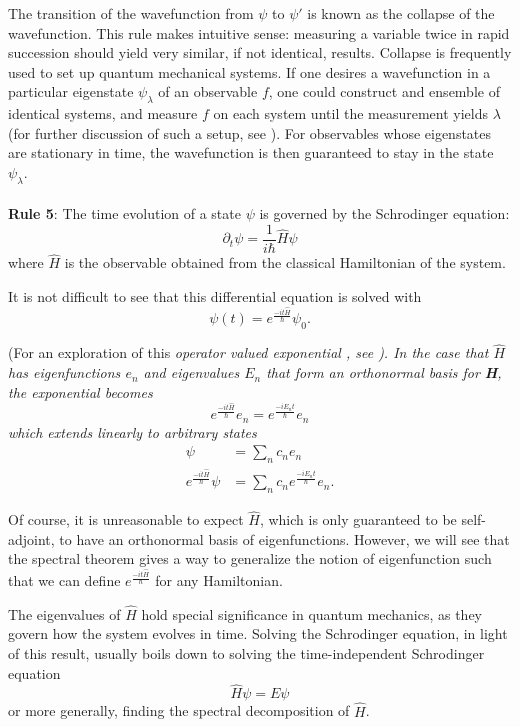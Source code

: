 The transition of the wavefunction from $\psi$ to $\psi '$ is known as the
collapse of the wavefunction. This rule makes intuitive sense: measuring a
variable twice in rapid succession should yield very similar, if not identical,
results. Collapse is frequently used to set up quantum mechanical systems. If
one desires a wavefunction in a particular eigenstate $\psi_{\lambda}$ of an
observable $f$, one could construct and ensemble of identical systems, and
measure $f$ on each system until the measurement yields $\lambda$ (for further
discussion of such a setup, see \cite{griffiths2005}). For observables
whose eigenstates are stationary in time, the wavefunction is then guaranteed to
stay in the state
$\psi_{\lambda}$.
\\
\\
\textbf{Rule 5}: The time evolution of a state $\psi$ is governed by the
Schrodinger equation:
\[
    \partial_t \psi = \frac{1}{i\hbar}\hat{H}\psi
\]
where $\hat{H}$ is the observable obtained from the classical Hamiltonian of the
system.

It is not difficult to see that this differential equation is solved with
\[
    \psi(t) = e^{\frac{-it\hat{H}}{\hbar}}\psi_0.
\]

(For an exploration of this \em operator valued exponential \em, see \cite[p.
74,208]{Hall2013}).
In the case that $\hat{H}$ has eigenfunctions
${e_n}$ and eigenvalues ${E_n}$ that form an orthonormal basis for \textbf{H},
the exponential becomes
\[
    e^{\frac{-it\hat{H}}{\hbar}}e_n = e^{\frac{-iE_nt}{\hbar}}e_n
\]
which extends linearly to arbitrary states
\[
    \begin{aligned}
        \psi &= \sum_n c_n e_n\\
        e^{\frac{-it\hat{H}}{\hbar}}\psi &= \sum_n c_n
        e^{\frac{-iE_nt}{\hbar}}e_n.
    \end{aligned}
\]

Of course, it is unreasonable to expect $\hat{H}$, which is only guaranteed to
be self-adjoint, to have an orthonormal basis of eigenfunctions. However, we
will see that the spectral theorem gives a way to generalize the notion of
eigenfunction such that we can define $e^{\frac{-it\hat{H}}{\hbar}}$ for any
Hamiltonian.

The eigenvalues of $\hat{H}$ hold special significance in quantum mechanics, as
they govern how the system evolves in time. Solving the Schrodinger equation, in
light of this result, usually boils down to solving the time-independent
Schrodinger equation
\[
    \hat{H}\psi=E\psi
\]
or more generally, finding the spectral decomposition of $\hat{H}$.


